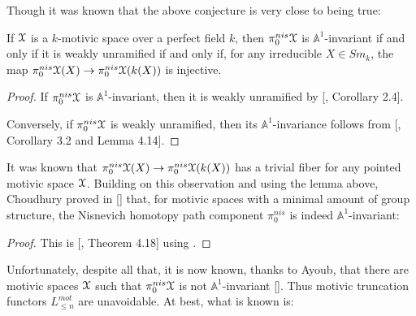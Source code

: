  Though it was known that the above conjecture is very close to being true:
        \begin{lem}
   If $\EuScript{X}$ is a $k$-motivic space over a perfect field $k$, then $\pi_0^{nis}\EuScript{X}$ is $\mathbb{A}^1$-invariant if and only if it is weakly unramified if and only if, for any irreducible $X\in Sm_k$, the map $\pi_0^{nis}\EuScript{X}(X)\to \pi_0^{nis}\EuScript{X}(k(X))$ is injective. 
\end{lem}
\begin{proof}
  If $\pi_0^{nis}\EuScript{X}$ is $\mathbb{A}^1$-invariant, then it is weakly unramified by [\cite{bachmann2024strongly}, Corollary 2.4].
  
  Conversely, if $\pi_0^{nis}\EuScript{X}$ is weakly unramified, then its $\mathbb{A}^1$-invariance follows from [\cite{choudhury2014connectivity}, Corollary 3.2 and Lemma 4.14].
\end{proof}
It was known that $\pi_0^{nis}\EuScript{X}(X)\to \pi_0^{nis}\EuScript{X}(k(X))$ has a trivial fiber for any pointed motivic space $\EuScript{X}$. Building on this observation and using the lemma above, Choudhury proved in [\cite{choudhury2014connectivity}] that, for motivic spaces with a minimal amount of group structure, the Nisnevich homotopy path component $\pi_0^{nis}$ is indeed $\mathbb{A}^1$-invariant:
   \begin{proof}
       This is [\cite{choudhury2014connectivity}, Theorem 4.18] using .
   \end{proof}
Unfortunately, despite all that, it is now known, thanks to Ayoub, that there are motivic spaces $\EuScript{X}$ such that $\pi_0^{nis}\EuScript{X}$ is not $\mathbb{A}^1$-invariant [\cite{ayoubcounterexamples}]. Thus motivic truncation functors $L_{\leq n}^{mot}$ are unavoidable. At best, what is known is:

